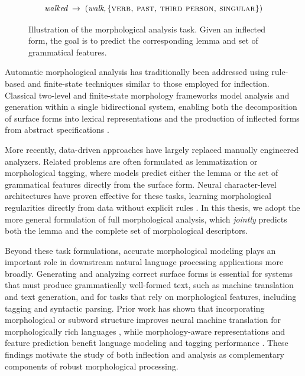 \begin{figure}[h]
\centering
\[
\textit{walked} \;\rightarrow\; (\textit{walk}, \{\textsc{verb, past, third person, singular}\})
\]
\caption{Illustration of the morphological analysis task. Given an inflected form, the goal is to predict the corresponding lemma and set of grammatical features.}
\label{fig:analysis_example}
\end{figure}

Automatic morphological analysis has traditionally been addressed using rule-based and finite-state techniques similar to those employed for inflection. Classical two-level and finite-state morphology frameworks model analysis and generation within a single bidirectional system, enabling both the decomposition of surface forms into lexical representations and the production of inflected forms from abstract specifications \parencite{Koskenniemi1983,BeesleyKarttunen2003}.

More recently, data-driven approaches have largely replaced manually engineered analyzers. Related problems are often formulated as lemmatization or morphological tagging, where models predict either the lemma or the set of grammatical features directly from the surface form. Neural character-level architectures have proven effective for these tasks, learning morphological regularities directly from data without explicit rules \parencite{malaviya-etal-2019-simple,cotterell-heigold-2017-cross}. In this thesis, we adopt the more general formulation of full morphological analysis, which \emph{jointly} predicts both the lemma and the complete set of morphological descriptors.

Beyond these task formulations, accurate morphological modeling plays an important role in downstream natural language processing applications more broadly. Generating and analyzing correct surface forms is essential for systems that must produce grammatically well-formed text, such as machine translation and text generation, and for tasks that rely on morphological features, including tagging and syntactic parsing. Prior work has shown that incorporating morphological or subword structure improves neural machine translation for morphologically rich languages \parencite{sennrich-etal-2016-neural}, while morphology-aware representations and feature prediction benefit language modeling and tagging performance \parencite{pmlr-v32-botha14, cotterell-heigold-2017-cross}. These findings motivate the study of both inflection and analysis as complementary components of robust morphological processing.

